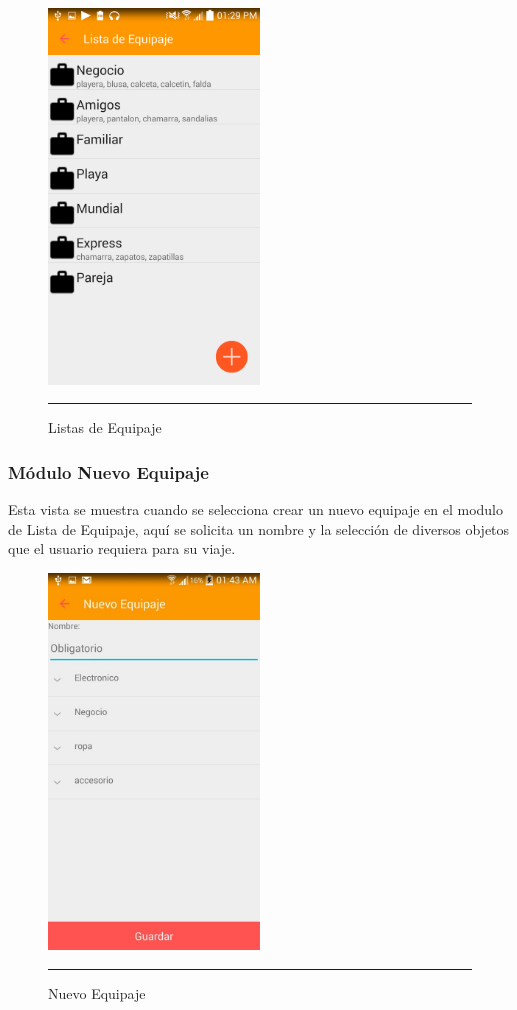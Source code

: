 \begin{figure}[h]
	\centering
		\includegraphics[width=0.5\textwidth]{Figuras/equipaje.png}
		\rule{30em}{0.5pt}
	\caption[Listas de Equipaje]{Listas de Equipaje}
	\label{fig:equipaje}
\end{figure}
\clearpage

\subsubsection{Módulo Nuevo Equipaje}
Esta vista se muestra cuando se selecciona crear un nuevo equipaje en el modulo de Lista de Equipaje, 
aquí se solicita un nombre y la selección de diversos objetos que el usuario requiera para su viaje.

\begin{figure}[h]
	\centering
		\includegraphics[width=0.5\textwidth]{Figuras/nuevoequipaje.jpg}
		\rule{30em}{0.5pt}
	\caption[Nuevo Equipaje]{Nuevo Equipaje}
	\label{fig:nuevoEquipaje}
\end{figure}
\clearpage

